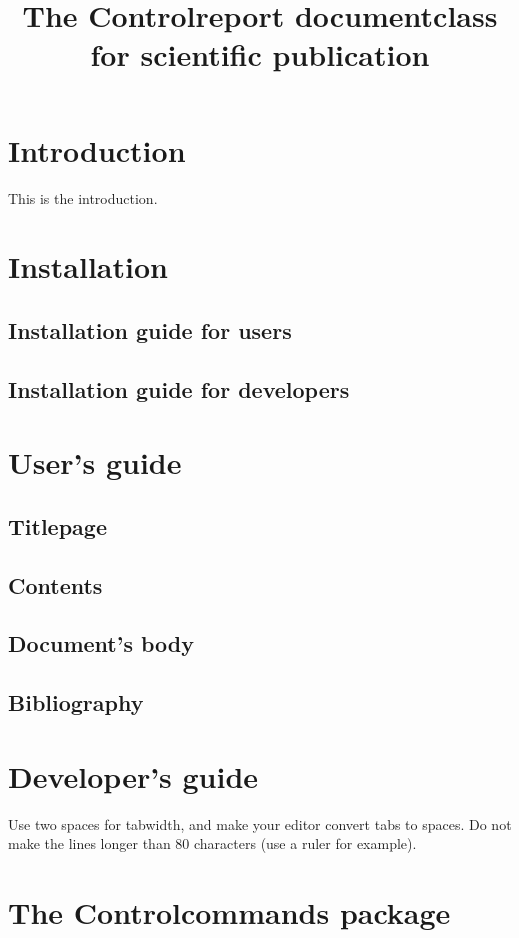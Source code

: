 \documentclass[11pt]{controlreport}
\title{The Controlreport documentclass for scientific publication}
\begin{document}
 	\titlepage
	
	\contents 
 
 	\chapter{Introduction}

 	This is the introduction.
 	
 	\chapter{Installation}

 	\section{Installation guide for users}
 	
 	\section{Installation guide for developers}

	\chapter{User's guide}
	
	\section{Titlepage}
	
	\section{Contents}
	
	\section{Document's body}
	
	\section{Bibliography}

	\chapter{Developer's guide}

	Use two spaces for tabwidth, and make your editor convert tabs to spaces. Do not make the lines longer than 80 characters (use a ruler for example).

	\chapter{The Controlcommands package}
\end{document}
